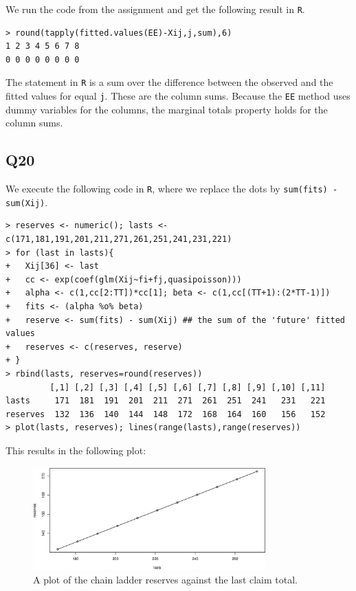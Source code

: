 \documentclass[11pt]{article}
\begin{document}
We run the code from the assignment and get the following result in \verb|R|.

\begin{verbatim}
> round(tapply(fitted.values(EE)-Xij,j,sum),6)
1 2 3 4 5 6 7 8 
0 0 0 0 0 0 0 0 
\end{verbatim}

The statement in \verb|R| is a sum over the difference between the observed and the fitted values for equal \verb|j|. These are the column sums. Because the \verb|EE| method uses dummy variables for the columns, the marginal totals property holds for the column sums.

\subsection*{Q20}

We execute the following code in \verb|R|, where we replace the dots by \verb|sum(fits) - sum(Xij)|.

\begin{verbatim}
> reserves <- numeric(); lasts <- c(171,181,191,201,211,271,261,251,241,231,221)
> for (last in lasts){
+   Xij[36] <- last
+   cc <- exp(coef(glm(Xij~fi+fj,quasipoisson)))
+   alpha <- c(1,cc[2:TT])*cc[1]; beta <- c(1,cc[(TT+1):(2*TT-1)])
+   fits <- (alpha %o% beta)
+   reserve <- sum(fits) - sum(Xij) ## the sum of the 'future' fitted values
+   reserves <- c(reserves, reserve) 
+ }
> rbind(lasts, reserves=round(reserves))
         [,1] [,2] [,3] [,4] [,5] [,6] [,7] [,8] [,9] [,10] [,11]
lasts     171  181  191  201  211  271  261  251  241   231   221
reserves  132  136  140  144  148  172  168  164  160   156   152
> plot(lasts, reserves); lines(range(lasts),range(reserves))
\end{verbatim}

This results in the following plot:

\begin{figure}[H]\label{fig:q20}
	\centering
	\includegraphics[width=0.8\textwidth]{fig_q20.eps}
	\caption{A plot of the chain ladder reserves against the last claim total.}
\end{figure}
\end{document}
